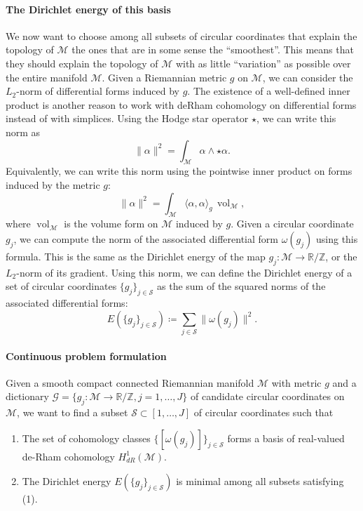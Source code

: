 \documentclass[a4paper,11pt, DIV=10]{scrartcl}
\numberwithin{equation}{section}
\theoremstyle{definition}
\theoremstyle{remark}
\newcommand{\Z}{\mathbb{Z}}
\newcommand{\R}{\mathbb{R}}
\newcommand{\mc}[1]{\mathcal{#1}}
\DeclareMathOperator{\vol}{vol}
\begin{document}
	\paragraph{The Dirichlet energy of this basis}
	
	We now want to choose among all subsets of circular coordinates that explain the topology of $\mc{M}$ the ones that are in some sense the \enquote{smoothest}.
	This means that they should explain the topology of $\mc{M}$ with as little \enquote{variation} as possible over the entire manifold $\mc{M}$.
	Given a Riemannian metric $g$ on $\mc{M}$, we can consider the $L_2$-norm of differential forms induced by $g$.
	The existence of a well-defined inner product is another reason to work with deRham cohomology on differential forms instead of with simplices.
	Using the Hodge star operator $\star$, we can write this norm as
		\begin{equation}
		\lVert \alpha \rVert^2 = \int_{\mc{M}} \alpha \wedge \star \alpha.
		\end{equation}
	Equivalently,
	we can write this norm using the pointwise inner product on forms induced by the metric $g$:
		\begin{equation}
		\lVert \alpha \rVert^2 = \int_{\mc{M}} \langle \alpha, \alpha \rangle_g \, \vol_{\mc{M}},
		\end{equation}
	where $\vol_{\mc{M}}$ is the volume form on $\mc{M}$ induced by $g$.
	Given a circular coordinate $g_j$, we can compute the norm of the associated differential form $\omega (g_j)$ using this formula.
	This is the same as the Dirichlet energy of the map $g_j\colon \mc{M}\to \R/\Z$, or the $L_2$-norm of its gradient.
	Using this norm, we can define the Dirichlet energy of a set of circular coordinates $\{g_{j}\}_{j\in \mc{S}}$ as the sum of the squared norms of the associated differential forms:
		\begin{equation}
		E(\{g_{j}\}_{j\in \mc{S}}) \coloneq \sum_{j\in \mc{S}} \lVert \omega (g_j)\rVert^2.
		\end{equation}
	\paragraph{Continuous problem formulation}
	Given a smooth compact connected Riemannian manifold $\mc{M}$ with metric $g$ and a dictionary $\mathcal{G}=\{g_j\colon \mc{M}\to \R/\Z, j=1,\dots, J\}$ of candidate circular coordinates on $\mc{M}$, we want to find a subset $\mc{S}\subset [1,\dots, J]$ of circular coordinates such that
	\begin{enumerate}
		\item The set of cohomology classes $\{[\omega (g_j)]\}_{j\in \mc{S}}$ forms a basis of real-valued de-Rham cohomology $H^1_{dR}(\mc{M})$.
		\item The Dirichlet energy $E(\{g_{j}\}_{j\in \mc{S}})$ is minimal among all subsets satisfying (1).
	\end{enumerate}
\end{document}
